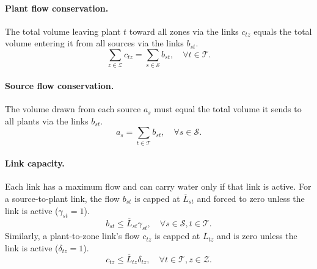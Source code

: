 \documentclass[10pt]{article}
\begin{document}
\paragraph{Plant flow conservation.} The total volume leaving plant $t$ toward all zones via the links $c_{tz}$ equals the total volume entering it from all sources via the links $b_{st}$.
\begin{equation}
    \sum_{z \in \mathcal{Z}} c_{tz} = \sum_{s \in \mathcal{S}} b_{st},
    \quad \forall t \in \mathcal{T}.
\end{equation}

\paragraph{Source flow conservation.} The volume drawn from each source $a_{s}$ must equal the total volume it sends to all plants via the links $b_{st}$.
\begin{equation}
    a_s = \sum_{t \in \mathcal{T}} b_{st} , \quad \forall s \in \mathcal{S}.
\end{equation}

\paragraph{Link capacity.} Each link has a maximum flow and can carry water only if that link is active.
For a source-to-plant link, the flow $b_{st}$ is capped at $\overline{L}_{st}$ and forced to zero unless the link is active ($\gamma_{st} = 1$).
\begin{equation}
    b_{st} \le \overline{L}_{st} \gamma_{st}, \quad \forall s \in \mathcal{S}, t \in \mathcal{T}.
\end{equation}
Similarly, a plant-to-zone link's flow $c_{tz}$ is capped at $\overline{L}_{tz}$ and is zero unless the link is active ($\delta_{tz} = 1$).
\begin{equation}
    c_{tz} \le \overline{L}_{tz} \delta_{tz}, \quad \forall t \in \mathcal{T}, z \in \mathcal{Z}.
\end{equation}
\end{document}
